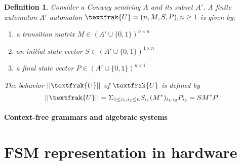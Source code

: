 \documentclass[]{article}
\newtheorem{definition}{Definition}
\begin{document}
\begin{definition}
    Consider a Conway semiring $A$ and its subset $A'$. 
    A finite automaton $A'$-automaton $\textfrak{U}=(n,M,S,P), n \geq 1$ is given by:
    \begin{enumerate}
        \item a transition matrix $M\in (A' \cup \{0,1\})^{n\times n}$
        \item an initial state vector $S\in (A' \cup \{0,1\})^{1\times n}$
        \item a final state vector $P\in (A' \cup \{0,1\})^{n\times 1}$
    \end{enumerate}
    The behavior $||\textfrak{U}||$ of $\textfrak{U}$ is defined by 
    \begin{equation}
        ||\textfrak{U}|| = \Sigma_{1 \leq i_1, i_2 \leq n} S_{i_1} (M^*)_{i_1,i_2} P_{i_2} = S M^* P
    \end{equation}
\end{definition}

\paragraph{Context-free grammars and algebraic systems}

\section{FSM representation in hardware}
\end{document}
